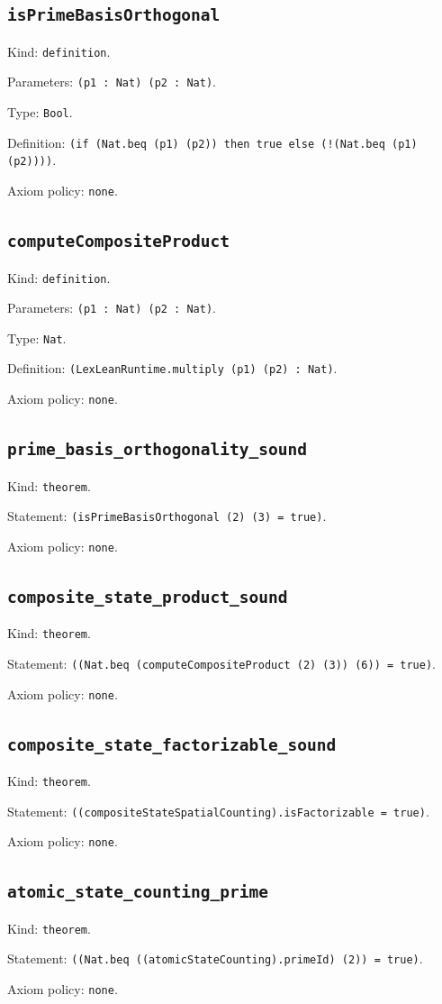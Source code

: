 \documentclass[11pt]{article}
\begin{document}
\subsection*{\texttt{isPrimeBasisOrthogonal}}
\noindent Kind: \texttt{definition}.\par
\noindent Parameters: \texttt{(p1 : Nat) (p2 : Nat)}.\par
\noindent Type: \texttt{Bool}.\par
\noindent Definition: \texttt{(if (Nat.beq (p1) (p2)) then true else (!(Nat.beq (p1) (p2))))}.\par
\noindent Axiom policy: \texttt{none}.\par
\subsection*{\texttt{computeCompositeProduct}}
\noindent Kind: \texttt{definition}.\par
\noindent Parameters: \texttt{(p1 : Nat) (p2 : Nat)}.\par
\noindent Type: \texttt{Nat}.\par
\noindent Definition: \texttt{(LexLeanRuntime.multiply (p1) (p2) : Nat)}.\par
\noindent Axiom policy: \texttt{none}.\par
\subsection*{\texttt{prime\_basis\_orthogonality\_sound}}
\noindent Kind: \texttt{theorem}.\par
\noindent Statement: \texttt{(isPrimeBasisOrthogonal (2) (3) = true)}.\par
\noindent Axiom policy: \texttt{none}.\par
\subsection*{\texttt{composite\_state\_product\_sound}}
\noindent Kind: \texttt{theorem}.\par
\noindent Statement: \texttt{((Nat.beq (computeCompositeProduct (2) (3)) (6)) = true)}.\par
\noindent Axiom policy: \texttt{none}.\par
\subsection*{\texttt{composite\_state\_factorizable\_sound}}
\noindent Kind: \texttt{theorem}.\par
\noindent Statement: \texttt{((compositeStateSpatialCounting).isFactorizable = true)}.\par
\noindent Axiom policy: \texttt{none}.\par
\subsection*{\texttt{atomic\_state\_counting\_prime}}
\noindent Kind: \texttt{theorem}.\par
\noindent Statement: \texttt{((Nat.beq ((atomicStateCounting).primeId) (2)) = true)}.\par
\noindent Axiom policy: \texttt{none}.\par
\end{document}
